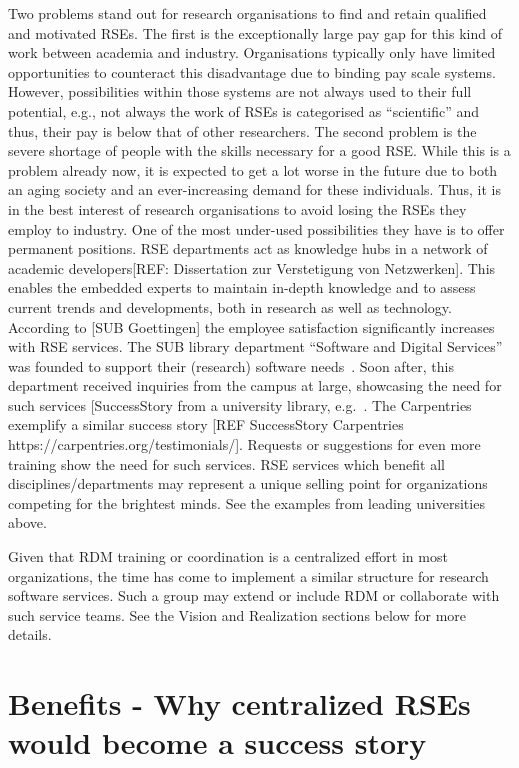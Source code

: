 \documentclass{article}
\makeatletter
\newcommand*{\eg}{e.g.\@\xspace}
\makeatother
\begin{document}
Two problems stand out for research organisations to find and retain qualified and motivated RSEs.
The first is the exceptionally large pay gap for this kind of work between academia and industry.
Organisations typically only have limited opportunities to counteract this disadvantage due to binding pay scale systems.
However, possibilities within those systems are not always used to their full potential, e.g., not always the work of RSEs is categorised as “scientific” and thus, their pay is below that of other researchers.
The second problem is the severe shortage of people with the skills necessary for a good RSE.
While this is a problem already now, it is expected to get a lot worse in the future due to both an aging society and an ever-increasing demand for these individuals.
Thus, it is in the best interest of research organisations to avoid losing the RSEs they employ to industry.
One of the most under-used possibilities they have is to offer permanent positions. 
RSE departments act as knowledge hubs in a network of academic developers[REF: Dissertation zur Verstetigung von Netzwerken].
This enables the embedded experts to maintain in-depth knowledge and to assess current trends and developments, both in research as well as technology.
According to [SUB Goettingen] the employee satisfaction significantly increases with RSE services.
The SUB library department “Software and Digital Services” was founded to support their (research) software needs~\autocite{schimavoigt2023}.
Soon after, this department received inquiries from the campus at large, showcasing the need for such services [SuccessStory from a university library, \eg ~\autocite{schimavoigt2023}. The Carpentries~\autocite{Carpentries} exemplify a similar success story [REF SuccessStory Carpentries https://carpentries.org/testimonials/]. Requests or suggestions for even more training show the need for such services.
RSE services which benefit all disciplines/departments may represent a unique selling point for organizations competing for the brightest minds.
See the examples from leading universities above.

Given that RDM training or coordination is a centralized effort in most organizations, the time has come to implement a similar structure for research software services.
Such a group may extend or include RDM or collaborate with such service teams.
See the Vision and Realization sections below for more details.

\section{Benefits - Why centralized RSEs would become a success story}
\end{document}
